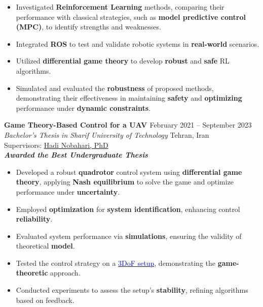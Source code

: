 \documentclass[12pt]{article}
\begin{document}
\begin{itemize} %
	\item Investigated \textbf{Reinforcement Learning} methods, comparing their performance with classical strategies, such as \textbf{model predictive control (MPC)}, to identify strengths and weaknesses.
	\item Integrated \textbf{ROS} to test and validate robotic systems in \textbf{real-world} scenarios.
	\item Utilized \textbf{differential game theory} to develop \textbf{robust} and \textbf{safe} RL algorithms.
	\item Simulated and evaluated the \textbf{robustness} of proposed methods, demonstrating their effectiveness in maintaining \textbf{safety} and \textbf{optimizing} performance under \textbf{dynamic constraints}.
\end{itemize}


\vspace{0.2in}
\noindent
{\bfseries Game Theory-Based Control for a UAV 
\href{https://github.com/alibaniasad1999/bachelor-thesis}{\faGithub}
\textcolor{red}{
\href{https://youtu.be/SXZACxGaE1A?si=61yCRB8jFIZlldFG}{\faYoutube}}
} \hfill February 2021 -- September 2023 \\ 
\noindent \textit{Bachelor's Thesis in Sharif University of Technology} \hfill Tehran, Iran \\ 
\noindent Supervisors: 
\href{https://ae.sharif.edu/~portal/faculty/1091235256}{Hadi Nobahari, PhD} \\
{\footnotesize \textbf{\textit{Awarded the Best Undergraduate Thesis \faMedal}}}

\begin{itemize} %
    \item Developed a robust \textbf{quadrotor} control system using \textbf{differential game theory}, applying \textbf{Nash equilibrium} to solve the game and optimize performance under \textbf{uncertainty}.
	 \item Employed \textbf{optimization} for \textbf{system identification}, enhancing control \textbf{reliability}.
    \item Evaluated system performance via \textbf{simulations}, ensuring the validity of theoretical \textbf{model}.
    \item Tested the control strategy on a \href{https://gcrc.sharif.edu/استند-آزمایشگاهی-کنترل-وضعیت-سه-درجه-آ/}{\textcolor{blue}{3DoF setup}}, demonstrating the \textbf{game-theoretic} approach.
    \item Conducted experiments to assess the setup's \textbf{stability}, refining algorithms based on feedback.
   
\end{itemize}
\end{document}
